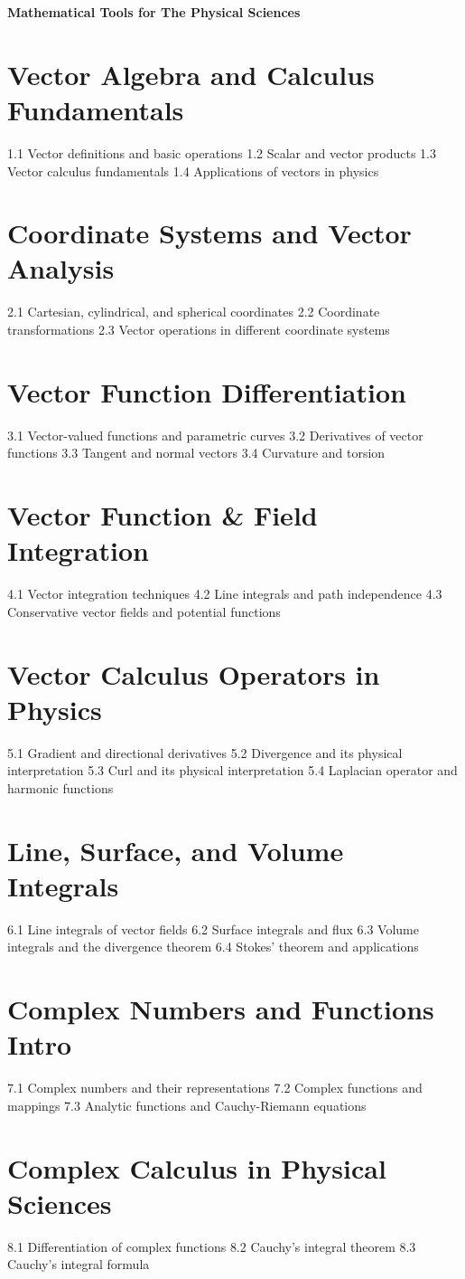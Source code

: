 {\LARGE \bf{Mathematical Tools for The Physical Sciences}}
\section{Vector Algebra and Calculus Fundamentals}
1.1 Vector definitions and basic operations
1.2 Scalar and vector products
1.3 Vector calculus fundamentals
1.4 Applications of vectors in physics
\section{Coordinate Systems and Vector Analysis}
2.1 Cartesian, cylindrical, and spherical coordinates
2.2 Coordinate transformations
2.3 Vector operations in different coordinate systems
\section{Vector Function Differentiation}
3.1 Vector-valued functions and parametric curves
3.2 Derivatives of vector functions
3.3 Tangent and normal vectors
3.4 Curvature and torsion
\section{Vector Function \& Field Integration}
4.1 Vector integration techniques
4.2 Line integrals and path independence
4.3 Conservative vector fields and potential functions
\section{Vector Calculus Operators in Physics}
5.1 Gradient and directional derivatives
5.2 Divergence and its physical interpretation
5.3 Curl and its physical interpretation
5.4 Laplacian operator and harmonic functions
\section{Line, Surface, and Volume Integrals}
6.1 Line integrals of vector fields
6.2 Surface integrals and flux
6.3 Volume integrals and the divergence theorem
6.4 Stokes' theorem and applications
\section{Complex Numbers and Functions Intro}
7.1 Complex numbers and their representations
7.2 Complex functions and mappings
7.3 Analytic functions and Cauchy-Riemann equations
\section{Complex Calculus in Physical Sciences}
8.1 Differentiation of complex functions
8.2 Cauchy's integral theorem
8.3 Cauchy's integral formula
